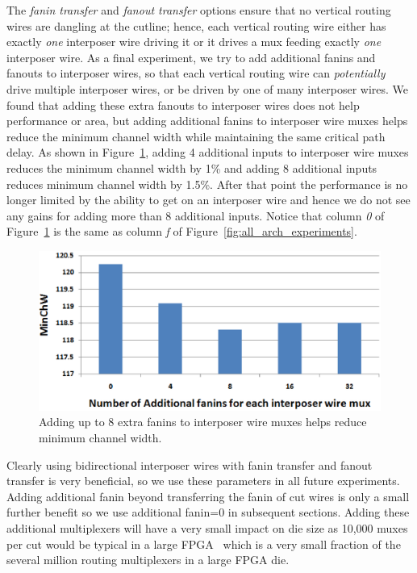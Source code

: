 \documentclass[journal]{IEEEtran}
\begin{document}
The \textit{fanin transfer} and \textit{fanout transfer} options ensure that no vertical routing wires are dangling at the cutline; hence, each vertical routing wire either has exactly \textit{one} interposer wire driving it or it drives a mux feeding exactly \textit{one} interposer wire. As a final experiment, we try to add additional fanins and fanouts to interposer wires, so that each vertical routing wire can \textit{potentially} drive multiple interposer wires, or be driven by one of many interposer wires. We found that adding these extra fanouts to interposer wires does not help performance or area, but adding additional fanins to interposer wire muxes helps reduce the minimum channel width while maintaining the same critical path delay. As shown in Figure~\ref{fig:additional_fanins}, adding 4 additional inputs to interposer wire muxes reduces the minimum channel width by 1\% and adding 8 additional inputs reduces minimum channel width by 1.5\%. After that point the performance is no longer limited by the ability to get on an interposer wire and hence we do not see any gains for adding more than 8 additional inputs. Notice that column \textit{0} of Figure~\ref{fig:additional_fanins} is the same as column \textit{f} of Figure~\ref{fig:all_arch_experiments}.

\begin{figure}[!h]
\centering
\includegraphics[width=\linewidth]{additional_fanins.eps}
\caption{Adding up to 8 extra fanins to interposer wire muxes helps reduce minimum channel width.}
\label{fig:additional_fanins}
\end{figure}

Clearly using bidirectional interposer wires with fanin transfer and fanout transfer is very beneficial, so we use these parameters in all future experiments. Adding additional fanin beyond transferring the fanin of cut wires is only a small further benefit so we use additional fanin=0 in subsequent sections. Adding these additional multiplexers will have a very small impact on die size as 10,000 muxes per cut would be typical in a large FPGA~\cite{xilinx7series} which is a very small fraction of the several million routing multiplexers in a large FPGA die.
\end{document}
